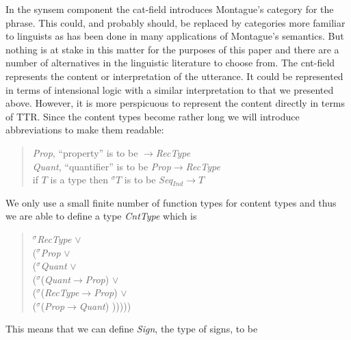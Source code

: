 In the synsem component
the cat-field introduces Montague's category for the phrase.  This
could, and probably should, be replaced by categories more familiar to
linguists as has been done in many applications of Montague's
semantics.  But nothing is at stake in this matter for the purposes of
this paper and there are a number of alternatives in the linguistic
literature to choose from.
The cnt-field represents the content or interpretation of the
utterance.  It could be represented in terms of intensional logic with a
similar interpretation to that we presented above.  However, it is
more perspicuous to represent the content directly in terms of TTR.
Since the content types become rather long we will introduce
abbreviations to make them readable:
\begin{quote}
\textit{Prop}, ``property'' is to be
$\rightarrow$\textit{RecType}
  \\
\textit{Quant}, ``quantifier'' is to be
\textit{Prop}$\rightarrow$\textit{RecType} \\
if $T$ is a type then $^\sigma T$ is to be
\textit{Seq}$_{\mathit{Ind}}\rightarrow T$ 
\end{quote}
We only use a small finite number of function types for content
types and thus we are able to define a type \textit{CntType} which is
\begin{quote}
$^\sigma$\textit{RecType}
$\vee$\\($^\sigma$\textit{Prop} $\vee$\\($^\sigma$\textit{Quant}
$\vee$\\($^\sigma$(\textit{Quant}$\rightarrow$\textit{Prop})
$\vee$\\($^\sigma$(\textit{RecType}$\rightarrow$\textit{Prop})
$\vee$\\($^\sigma$(\textit{Prop}$\rightarrow$\textit{Quant}) 
)))))\ignore{))}
\end{quote}
This means that we can define \textit{Sign}, the type of signs, to be
